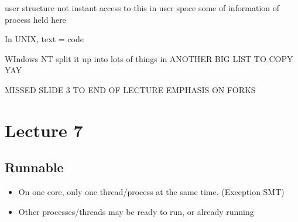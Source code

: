 \documentclass{article}
\begin{document}
		user structure
			not instant access to this
			in user space
			some of information of process held here

		In UNIX, text = code

	WIndows NT
		split it up into lots of things in ANOTHER BIG LIST TO COPY YAY

		MISSED SLIDE 3 TO END OF LECTURE
			EMPHASIS ON FORKS

\section{Lecture 7}
	\subsection{Runnable}
		\begin{itemize}
			\item On one core, only one thread/process at the same time. (Exception SMT)
			\item Other processes/threads may be ready to run, or already running
		\end{itemize}
\end{document}
